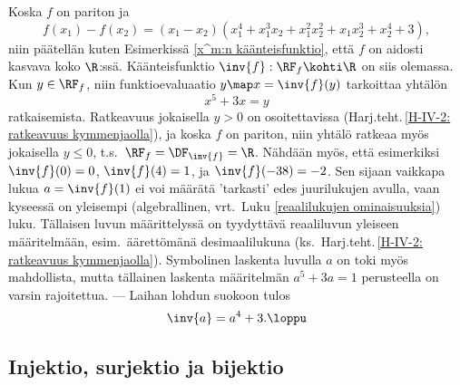 \ratk Koska $f$ on pariton ja 
\[
f(x_1)-f(x_2)=(x_1-x_2)(x_1^4+x_1^3x_2+x_1^2x_2^2+x_1x_2^3+x_2^4+3),
\]
niin päätellän kuten Esimerkissä \ref{x^m:n käänteisfunktio}, että $f$ on aidosti 
kasvava koko $\R$:ssä. Käänteisfunktio $\inv{f}: \RF_f \kohti \R$ on siis olemassa. Kun
$y \in \RF_f$, niin funktioevaluaatio $y \map x = \inv{f}(y)$ tarkoittaa yhtälön
\[
x^5+3x=y
\]
ratkaisemista. Ratkeavuus jokaisella $y>0$ on osoitettavissa
(Harj.teht.\,\ref{H-IV-2: ratkeavuus kymmenjaolla}), ja koska $f$ on pariton, niin yhtälö
ratkeaa myös jokaisella $y \le 0$, t.s.\ $\RF_f=\DF_{\inv{f}}=\R$. Nähdään myös, että 
esimerkiksi $\inv{f}(0)=0$, $\inv{f}(4)=1$, ja $\inv{f}(-38)=-2$. Sen sijaan vaikkapa lukua
$a=\inv{f}(1)$ ei voi määrätä 'tarkasti' edes juurilukujen avulla, vaan kyseessä on yleisempi
(algebrallinen, vrt.\ Luku \ref{reaalilukujen ominaisuuksia}) luku. Tällaisen luvun
määrittelyssä on tyydyttävä reaaliluvun yleiseen määritelmään, esim.\ äärettömänä
desimaalilukuna (ks.\ Harj.teht.\,\ref{H-IV-2: ratkeavuus kymmenjaolla}). Symbolinen laskenta
luvulla $a$ on toki myös mahdollista, mutta tällainen laskenta määritelmän $a^5 + 3a = 1$
perusteella on varsin rajoitettua. --- Laihan lohdun suokoon tulos
\[
\inv{a}=a^4+3. \loppu
\]

\subsection*{Injektio, surjektio ja bijektio}
  

